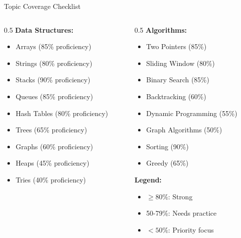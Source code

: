 \documentclass[aspectratio=169,xcolor=dvipsnames]{beamer}
\begin{document}
\begin{frame}{Topic Coverage Checklist}
  \begin{columns}
    \begin{column}{0.5\textwidth}
      \textbf{Data Structures:}
      \begin{itemize}
        \item[\checkmark] Arrays (85\% proficiency)
        \item[\checkmark] Strings (80\% proficiency)
        \item[\checkmark] Stacks (90\% proficiency)
        \item[\checkmark] Queues (85\% proficiency)
        \item[\checkmark] Hash Tables (80\% proficiency)
        \item[$\triangle$] Trees (65\% proficiency)
        \item[$\triangle$] Graphs (60\% proficiency)
        \item[$\times$] Heaps (45\% proficiency)
        \item[$\times$] Tries (40\% proficiency)
      \end{itemize}
    \end{column}

    \begin{column}{0.5\textwidth}
      \textbf{Algorithms:}
      \begin{itemize}
        \item[\checkmark] Two Pointers (85\%)
        \item[\checkmark] Sliding Window (80\%)
        \item[\checkmark] Binary Search (85\%)
        \item[$\triangle$] Backtracking (60\%)
        \item[$\triangle$] Dynamic Programming (55\%)
        \item[$\times$] Graph Algorithms (50\%)
        \item[\checkmark] Sorting (90\%)
        \item[$\triangle$] Greedy (65\%)
      \end{itemize}

      \vspace{0.3cm}
      \textbf{Legend:}
      \begin{itemize}
        \item[\checkmark] $\ge 80\%$: Strong
        \item[$\triangle$] 50-79\%: Needs practice
        \item[$\times$] $< 50\%$: Priority focus
      \end{itemize}
    \end{column}
  \end{columns}
\end{frame}
\end{document}
